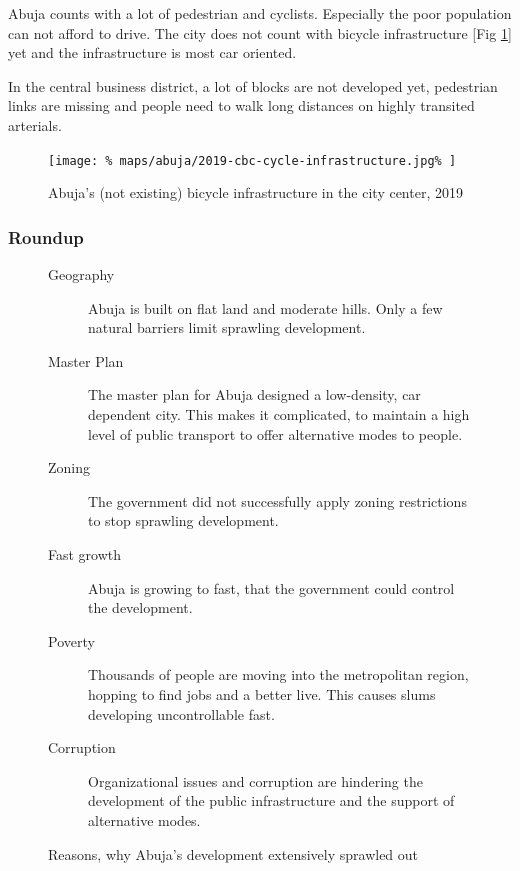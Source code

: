\documentclass{article}
\begin{document}
\begin{multicols}{2}
			Abuja counts with a lot of pedestrian and cyclists. Especially the poor population can not afford to drive.
			The city does not count with bicycle infrastructure [Fig \ref{fig:map:abuja-bicycle-map-2019}] yet and the infrastructure is most car oriented.
			
			In the central business district, a lot of blocks are not developed yet, pedestrian links are missing and people need to walk long distances on highly transited arterials.
			
			\begin{figure}[H]
				\texttt{[image: \%
					maps/abuja/2019-cbc-cycle-infrastructure.jpg\%
				]}
				\caption{Abuja's (not existing) bicycle infrastructure in the city center, 2019 \cite{OpenCycleMap:Abuja}}
				\label{fig:map:abuja-bicycle-map-2019}
			\end{figure}	
			
			
			\subsubsection{Roundup}
			
			\begin{figure}[H]
				\begin{description}
					\item [Geography] Abuja is built on flat land and moderate hills. Only a few natural barriers limit sprawling development.
					\item [Master Plan] The master plan for Abuja designed a low-density, car dependent city. This makes it complicated, to maintain a high level of public transport to offer alternative modes to people.
					\item [Zoning] The government did not successfully apply zoning restrictions to stop sprawling development.
					\item [Fast growth] Abuja is growing to fast, that the government could control the development.
					\item [Poverty] Thousands of people are moving into the metropolitan region, hopping to find jobs and a better live. This causes slums developing uncontrollable fast.
					\item [Corruption] Organizational issues and corruption are hindering the development of the public infrastructure and the support of alternative modes.
				\end{description}
				\caption{Reasons, why Abuja's development extensively sprawled out}
				\label{fig:list:abuja-development-reasons}
			\end{figure}
			

\end{multicols}
\end{document}

